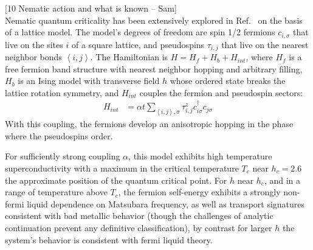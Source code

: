 \documentclass[amsmath,amssymb, aps, prx, longbibliography, twocolumn]{revtex4-1}
\begin{document}
[10 Nematic action and what is known -- Sam]\\
Nematic quantum criticality has been extensively explored in Ref.~\cite{Lederer4905} on the basis of a lattice model. The model's degrees of freedom are spin 1/2 fermions $c_{i,\sigma}$ that live on the sites $i$ of a square lattice, and pseudospins $\tau_{i,j}$ that live on the nearest neighbor bonds $\left<i,j\right>$. The Hamiltonian is $H = H_{f} + H_{b} + H_{int}$, where $H_{f}$ is a free fermion band structure with nearest neighbor hopping and arbitrary filling, $H_{b}$ is an Ising model with transverse field $h$ whose ordered state breaks the lattice rotation symmetry, and $H_{int}$ couples the fermion and pseudospin sectors:
\begin{align*}
    H_{int} &= \alpha t\sum_{\left<i,j\right>,\sigma}\tau^{z}_{i,j}c_{i\sigma}^{\dagger}c_{j\sigma}
\end{align*}
 With this coupling, the fermions develop an anisotropic hopping in the phase where the pseudospins order. 
 
For sufficiently strong coupling $\alpha$, this model exhibits high temperature superconductivity with a maximum in the critical temperature $T_{c}$ near $h_{c} = 2.6$ the approximate position of the quantum critical point. For $h$ near $h_{c}$, and in a range of temperature above $T_{c}$, the fermion self-energy exhibits a strongly non-fermi liquid dependence on Matsubara frequency, as well as transport signatures consistent with bad metallic behavior (though the challenges of analytic continuation prevent any definitive classification), by contrast for larger $h$ the system's behavior is consistent with fermi liquid theory.
\\
\\
\\
\\
\\
\\
\\
\\
\\
\end{document}
